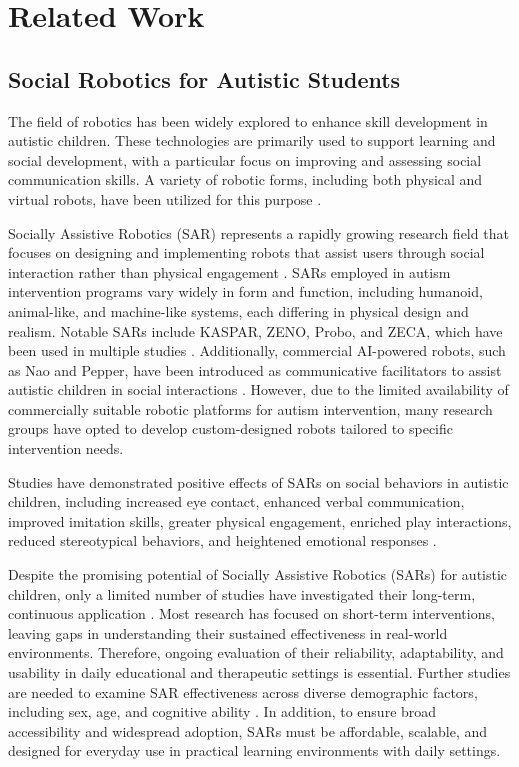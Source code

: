 
\section{Related Work}

\subsection{Social Robotics for Autistic Students} %

The field of robotics has been widely explored to enhance skill development in autistic children. These technologies are primarily used to support learning and social development, with a particular focus on improving and assessing social communication skills. A variety of robotic forms, including both physical and virtual robots, have been utilized for this purpose \cite{Mohammed2020robot}.

Socially Assistive Robotics (SAR) represents a rapidly growing research field that focuses on designing and implementing robots that assist users through social interaction rather than physical engagement \cite{Diehl2012cu}\cite{Ricks2010tc}\cite{Syriopoulou-Delli2020ra}. SARs employed in autism intervention programs vary widely in form and function, including humanoid, animal-like, and machine-like systems, each differing in physical design and realism. Notable SARs include KASPAR, ZENO, Probo, and ZECA, which have been used in multiple studies \cite{Syriopoulou-Delli2020ra}. Additionally, commercial AI-powered robots, such as Nao and Pepper, have been introduced as communicative facilitators to assist autistic children in social interactions \cite{10.1145/3461615.3485421}\cite{Lemaignan2024pepper}. However, due to the limited availability of commercially suitable robotic platforms for autism intervention, many research groups have opted to develop custom-designed robots tailored to specific intervention needs. 

Studies have demonstrated positive effects of SARs on social behaviors in autistic children, including increased eye contact, enhanced verbal communication, improved imitation skills, greater physical engagement, enriched play interactions, reduced stereotypical behaviors, and heightened emotional responses \cite{Scassellati2012ar}.

Despite the promising potential of Socially Assistive Robotics (SARs) for autistic children, only a limited number of studies have investigated their long-term, continuous application \cite{conti2017dd}\cite{vagnetti2024social}. Most research has focused on short-term interventions, leaving gaps in understanding their sustained effectiveness in real-world environments. Therefore, ongoing evaluation of their reliability, adaptability, and usability in daily educational and therapeutic settings is essential. Further studies are needed to examine SAR effectiveness across diverse demographic factors, including sex, age, and cognitive ability \cite{Mohammed2020robot}. In addition, to ensure broad accessibility and widespread adoption, SARs must be affordable, scalable, and designed for everyday use in practical learning environments with daily settings. 

